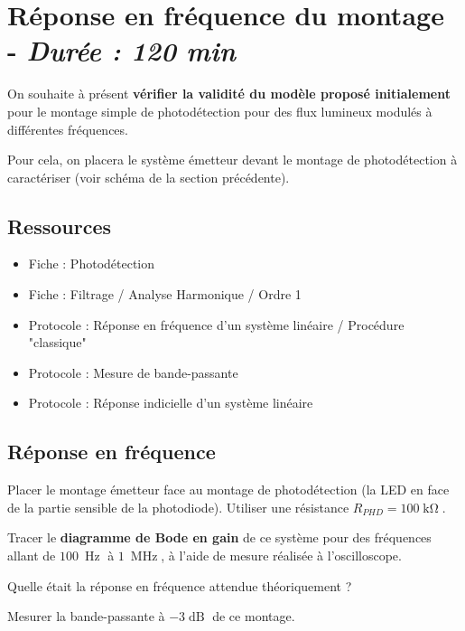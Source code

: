 \clearpage
\section{Réponse en fréquence du montage - \textit{Durée : 120 min}}

On souhaite à présent \textbf{vérifier la validité du modèle proposé initialement} pour le montage simple de photodétection pour des flux lumineux modulés à différentes fréquences.

Pour cela, on placera le système émetteur devant le montage de photodétection à caractériser (voir schéma de la section précédente).

\subsection{Ressources}

\begin{itemize}
	\item Fiche : Photodétection
	\item Fiche : Filtrage / Analyse Harmonique / Ordre 1
	\item Protocole : Réponse en fréquence d'un système linéaire / Procédure "classique"
	\item Protocole : Mesure de bande-passante
	\item Protocole : Réponse indicielle d'un système linéaire
\end{itemize}



\subsection{Réponse en fréquence}

\Manip Placer le montage émetteur face au montage de photodétection (la LED en face de la partie sensible de la photodiode). Utiliser une résistance $R_{PHD} = 100\operatorname{k\Omega}$.

\Manip Tracer le \textbf{diagramme de Bode en gain} de ce système pour des fréquences allant de $100~\operatorname{Hz}$ à $1~\operatorname{MHz}$, à l'aide de mesure réalisée à l'oscilloscope.

\Quest Quelle était la réponse en fréquence attendue théoriquement ? 

\Manip Mesurer la bande-passante à $-3\operatorname{dB}$ de ce montage.

